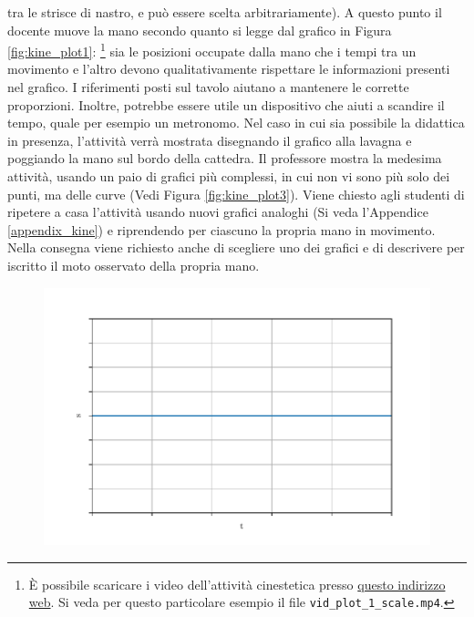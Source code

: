 \documentclass{report} \usepackage[T1]{fontenc} \usepackage[italian]{babel}
\begin{document}
tra le strisce di nastro, e può essere scelta arbitrariamente). A questo
punto il docente muove la mano secondo quanto
si legge dal grafico in Figura \ref{fig:kine_plot1}:
\footnote{\`E possibile scaricare i video dell'attività cinestetica presso
            \href{https://github.com/savaroskij/PED1/tree/master/progetto_finale/media/video/kine_videos_1}{questo indirizzo web}.
            Si veda per questo particolare esempio il file \texttt{vid\_plot\_1\_scale.mp4}.
         }
sia le posizioni occupate dalla
mano che i tempi tra un movimento e l’altro devono qualitativamente
rispettare le informazioni presenti nel grafico. I riferimenti posti sul tavolo
aiutano a mantenere le corrette proporzioni. Inoltre, potrebbe essere utile un
dispositivo che aiuti a scandire il tempo, quale per esempio un metronomo. Nel
caso in cui sia possibile la didattica in presenza, l’attività verrà mostrata
disegnando il grafico alla lavagna e poggiando la mano sul bordo della
cattedra. Il professore mostra la medesima attività, usando un paio di grafici
più complessi, in cui non vi sono più solo dei punti, ma delle curve (Vedi Figura
\ref{fig:kine_plot3}).
Viene chiesto agli studenti di ripetere a casa l’attività usando
nuovi grafici analoghi (Si veda l'Appendice \ref{appendix_kine}) e riprendendo
per ciascuno la propria mano in movimento.
Nella consegna viene richiesto anche
di scegliere uno dei grafici e di descrivere per iscritto il moto osservato della
propria mano.

\begin{figure}[H]
\centering
  \includegraphics[width=\textwidth]{kine_plot2}
  \label{fig:kine_plot2}
\end{figure}
\end{document}
